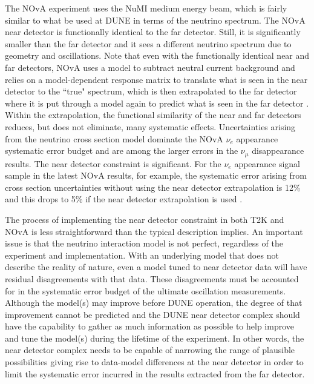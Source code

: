 The NOvA experiment uses the NuMI medium energy beam, which is fairly similar to what be used at DUNE in terms of the neutrino spectrum.  The NOvA near detector is functionally identical to the far detector.  Still, it is significantly smaller than the far detector and it sees a different neutrino spectrum due to geometry and oscillations.  Note that even with the functionally identical near and far detectors, NOvA uses a model to subtract neutral current background and relies on a model-dependent response matrix to translate what is seen in the near detector to the ``true" spectrum, which is then extrapolated to the far detector where it is put through a model again to predict what is seen in the far detector \cite{NOvA:2018gge, WolcottNUINT2018}.  Within the extrapolation, the functional similarity of the near and far detectors reduces, but does not eliminate, many systematic effects.  Uncertainties arising from the neutrino cross section model dominate the NOvA $\nu_{e}$ appearance systematic error budget and are among the larger errors in the $\nu_{\mu}$ disappearance results.  The near detector constraint is significant.  For the $\nu_{e}$ appearance signal sample in the latest NOvA results, for example, the systematic error arising from cross section uncertainties without using the near detector extrapolation is 12\% and this drops to 5\% if the near detector extrapolation is used \cite{WolcottNUINT2018}.

The process of implementing the near detector constraint in both T2K and NOvA is less straightforward than the typical description implies.
An important issue is that the neutrino interaction model is not perfect, regardless of the experiment and implementation.  With an underlying model that does not describe the reality of nature, even a model tuned to near detector data will have residual disagreements with that data.  These disagreements must be accounted for in the systematic error budget of the ultimate oscillation measurements.  Although the model(s) may improve before DUNE operation, the degree of that improvement cannot be predicted and the DUNE near detector complex should have the capability to gather as much information as possible to help improve and tune the model(s) during the lifetime of the experiment.  In other words, the near detector complex needs to be capable of narrowing the range of plausible possibilities giving rise to data-model differences at the near detector in order to limit the systematic error incurred in the results extracted from the far detector.   

